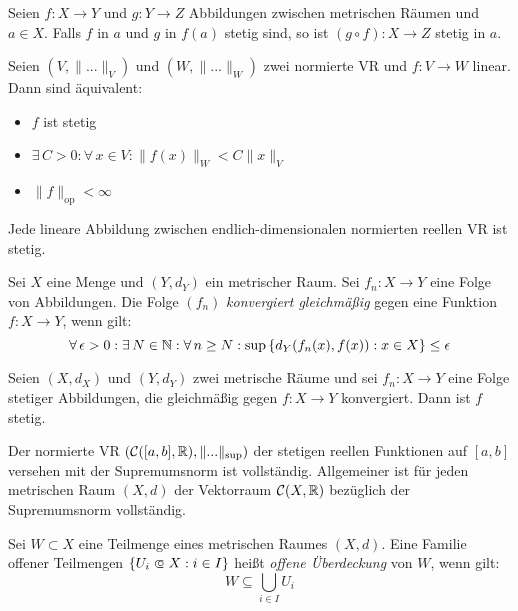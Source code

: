 \documentclass{cheat-sheet}
\newcommand\opn{\mathrel{\ooalign{$\subset$\cr
  \hidewidth\raise.1ex\hbox{$\circ\mkern.5mu$}\cr}}}
\begin{document}
\begin{satz}
Seien $f : X \to Y$ und $g : Y \to Z$ Abbildungen zwischen metrischen Räumen und $a \in X$. Falls $f$ in $a$ und $g$ in $f(a)$ stetig sind, so ist $(g \circ f) : X \to Z$ stetig in $a$.
\end{satz}


\begin{satz}
Seien $(V, \| ... \|_V)$ und $(W, \| ... \|_W)$ zwei normierte VR und $f : V \to W$ linear. Dann sind äquivalent:
\begin{itemize}
  \item $f$ ist stetig
  \item $\exists\,C > 0 : \forall\,x \in V : \| f(x) \|_W < C \| x \|_V$
  \item $\| f \|_\text{op} < \infty$
\end{itemize}
\end{satz}

\begin{kor}
Jede lineare Abbildung zwischen endlich-dimensionalen normierten reellen VR ist stetig.
\end{kor}

\begin{defn}
Sei $X$ eine Menge und $(Y, d_Y)$ ein metrischer Raum. Sei $f_n : X \to Y$ eine Folge von Abbildungen. Die Folge $(f_n)$ \emph{konvergiert gleichmäßig} gegen eine Funktion $f : X \to Y$, wenn gilt:
\[ \forall\,\epsilon > 0 : \exists\,N \in \mathbb{N} : \forall\,n \ge N : \sup\left\{ d_Y(f_n(x), f(x)) : x \in X \right\} \le \epsilon \]
\end{defn}

\begin{satz}
Seien $(X, d_X)$ und $(Y, d_Y)$ zwei metrische Räume und sei $f_n : X \to Y$ eine Folge stetiger Abbildungen, die gleichmäßig gegen $f : X \to Y$ konvergiert. Dann ist $f$ stetig.
\end{satz}

\begin{kor}
Der normierte VR $(\mathcal{C}([a, b], \mathbb{R}), \| ... \|_{\sup})$ der stetigen reellen Funktionen auf $[a, b]$ versehen mit der Supremumsnorm ist vollständig. Allgemeiner ist für jeden metrischen Raum $(X, d)$ der Vektorraum $\mathcal{C}(X, \mathbb{R})$ bezüglich der Supremumsnorm vollständig.
\end{kor}

\begin{defn}
Sei $W \subset X$ eine Teilmenge eines metrischen Raumes $(X, d)$. Eine Familie offener Teilmengen $\{ U_i \opn X : i \in I \}$ heißt \emph{offene Überdeckung} von $W$, wenn gilt:
\[ W \subseteq \bigcup_{i \in I} U_i \]
\end{defn}
\end{document}
